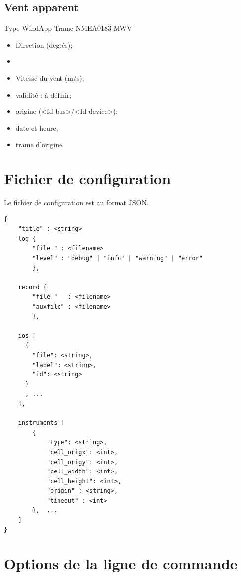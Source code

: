 \documentclass[a4paper,11pt]{report}
\begin{document}
\subsection{Vent apparent}\label{ventapparent}
Type WindApp
Trame NMEA0183 MWV

\begin{itemize}
	\item Direction (degrés);
    \item 
	\item Vitesse du vent (m/s);
	
	\item validité : à définir;
	\item origine (<Id bus>/<Id device>);
	\item date et heure;
	\item trame d'origine.
\end{itemize}


\section{Fichier de configuration}\label{configfile}
Le fichier de configuration est au format JSON.
\\
\begin{verbatim}
{
	"title" : <string>
    log {
        "file " : <filename>
        "level" : "debug" | "info" | "warning" | "error" 
        },
    
    record {
	    "file "   : <filename>
        "auxfile" : <filename>
        },

    ios [
      {
        "file": <string>,
        "label": <string>,
        "id": <string>
      }
      , ... 
    ],
    
    instruments [
        {
            "type": <string>,
            "cell_origx": <int>,
            "cell_origy": <int>,
            "cell_width": <int>,
            "cell_height": <int>,
            "origin" : <string>,
            "timeout" : <int>
        },  ... 
    ]
} 
\end{verbatim}


\section{Options de la ligne de commande}\label{optionslignecommande}
\end{document}
